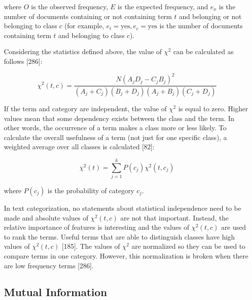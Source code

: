 \documentclass[11pt,openany,executivepaper]{book}
\begin{document}
where $O$ is the observed frequency, $E$ is the expected frequency, and $e_x$ is the number of documents containing or not containing term $t$ and belonging or not belonging to class $c$ (for example, $e_t = \text{yes}, e_c = \text{yes}$ is the number of documents containing term $t$ and belonging to class $c$).

Considering the statistics defined above, the value of $\chi^2$ can be calculated as follows [286]:

\begin{equation}
    \chi^2(t,c) = \frac{N(A_j D_j - C_j B_j)^2}{(A_j + C_j)(B_j + D_j)(A_j + B_j)(C_j + D_j)}
\end{equation}

If the term and category are independent, the value of $\chi^2$ is equal to zero. Higher values mean that some dependency exists between the class and the term. In other words, the occurrence of a term makes a class more or less likely.
To calculate the overall usefulness of a term (not just for one specific class), a weighted average over all classes is calculated [82]:

\begin{equation}
    \chi^2(t) = \sum_{j=1}^{k} P(c_j) \chi^2(t, c_j)
\end{equation}

where $P(c_j)$ is the probability of category $c_j$.

In text categorization, no statements about statistical independence need to be made and absolute values of $\chi^2(t, c)$ are not that important. Instead, the relative importance of features is interesting and the values of $\chi^2(t, c)$ are used to rank the terms. Useful terms that are able to distinguish classes have high values of $\chi^2(t, c)$ [185]. The values of $\chi^2$ are normalized so they can be used to compare terms in one category. However, this normalization is broken when there are low frequency terms [286].

\subsection{Mutual Information}
\end{document}
